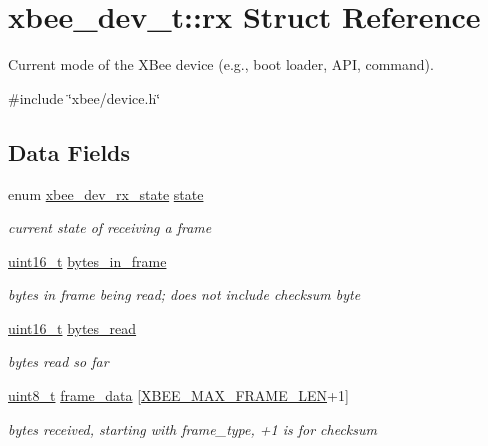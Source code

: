 \hypertarget{structxbee__dev__t_1_1rx}{}\section{xbee\+\_\+dev\+\_\+t\+:\+:rx Struct Reference}
\label{structxbee__dev__t_1_1rx}


Current mode of the X\+Bee device (e.\+g., boot loader, A\+PI, command).  




{\ttfamily \#include \char`\"{}xbee/device.\+h\char`\"{}}

\subsection*{Data Fields}
\begin{DoxyCompactItemize}
\item 
enum \hyperlink{group__xbee__device_ga30374ada0aff261c5da7557882fd09de}{xbee\+\_\+dev\+\_\+rx\+\_\+state} \hyperlink{group__xbee__device_ga758a79cfaf819f091728c06474466321}{state}
\begin{DoxyCompactList}\small\item\em current state of receiving a frame \end{DoxyCompactList}\item 
\hyperlink{group__hal__dos_ga5a8b2dc9e45a9ee81a94ef304fb62505}{uint16\+\_\+t} \hyperlink{group__xbee__device_ga1048ca0eb1adc5759a0df48ae8ae740a}{bytes\+\_\+in\+\_\+frame}
\begin{DoxyCompactList}\small\item\em bytes in frame being read; does not include checksum byte \end{DoxyCompactList}\item 
\hyperlink{group__hal__dos_ga5a8b2dc9e45a9ee81a94ef304fb62505}{uint16\+\_\+t} \hyperlink{group__xbee__device_gad7b2ae5814cb8706ab662a5d67e4837a}{bytes\+\_\+read}
\begin{DoxyCompactList}\small\item\em bytes read so far \end{DoxyCompactList}\item 
\hyperlink{group__hal__dos_gae1affc9ca37cfb624959c866a73f83c2}{uint8\+\_\+t} \hyperlink{group__xbee__device_gaa172073584adf9e2f74034489f9cd2a4}{frame\+\_\+data} \mbox{[}\hyperlink{group__xbee__device_gad842f3c5f8d2264a99ab67a01054323a}{X\+B\+E\+E\+\_\+\+M\+A\+X\+\_\+\+F\+R\+A\+M\+E\+\_\+\+L\+EN}+1\mbox{]}
\begin{DoxyCompactList}\small\item\em bytes received, starting with frame\+\_\+type, +1 is for checksum \end{DoxyCompactList}\end{DoxyCompactItemize}


